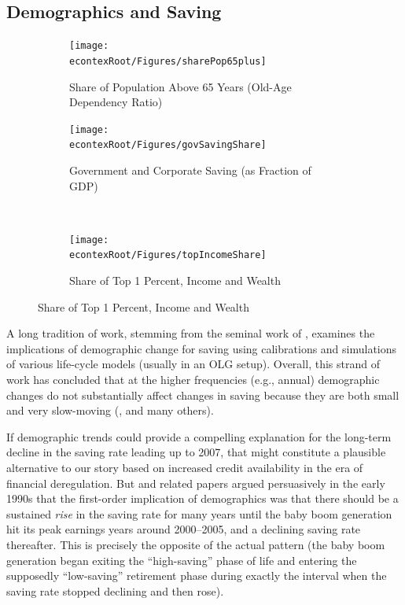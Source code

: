 \documentclass[titlepage]{\econtex}
\begin{document}
\hypertarget{Demographics-and-Saving}{}
\subsection{Demographics and Saving} \label{DemSav}

\hypertarget{fig:AddDataSeries}{}
\begin{figure}		\caption{Additional Data Series: Demographics, Government Saving and Inequality} \label{fig:addVars}
	\centering
	\begin{subfigure}[t]{0.49\textheight}
    \centering
		{\texttt{[image: \\econtexRoot/Figures/sharePop65plus]}}
		\caption{Share of Population Above 65 Years (Old-Age Dependency Ratio)}		\label{f65+}
	\end{subfigure}
	\begin{subfigure}[t]{0.49\textheight}
		\centering
		{\texttt{[image: \\econtexRoot/Figures/govSavingShare]}}
		\caption{Government and Corporate Saving (as Fraction of GDP)} \label{fgovSav}
	\end{subfigure} \\
	\begin{subfigure}[t]{0.49\textheight}
		\centering
		{\texttt{[image: \\econtexRoot/Figures/topIncomeShare]}}
		\caption{Share of Top 1 Percent, Income and Wealth} \label{fTopShare}
	\end{subfigure}
\end{figure}



A long tradition of work, stemming from the seminal work of \cite{mb54}, examines the implications of demographic change for saving using calibrations and simulations of various life-cycle models (usually in an OLG setup). 
Overall, this strand of work has concluded that at the higher frequencies (e.g., annual) demographic changes do not substantially affect changes in saving because they are both small and very slow-moving (\cite{scWhySavSoLow}, \citet{parker_nberma_spendthrift} and many others).

If demographic trends could provide a compelling explanation for the long-term decline in the saving rate leading up to 2007, that might constitute a plausible alternative to our story based on increased credit availability in the era of financial deregulation.  But \cite{auerbachKotlikoffDemographicsAndSaving} and related papers argued persuasively in the early 1990s that the first-order implication of demographics was that there should be a sustained \textit{rise} in the saving rate for many years until the baby boom generation hit its peak earnings years around 2000--2005, and a declining saving rate thereafter.  This is precisely the opposite of the actual pattern (the baby boom generation began exiting the ``high-saving'' phase of life and entering the supposedly ``low-saving'' retirement phase during exactly the interval when the saving rate stopped declining and then rose).
\end{document}
